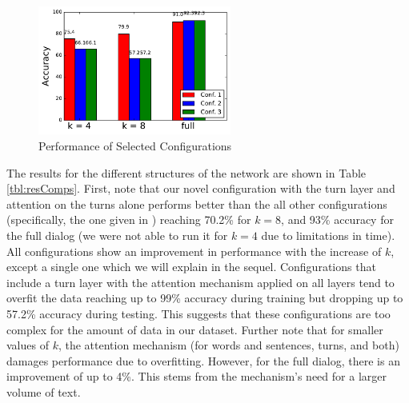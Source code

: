 \begin{figure}[]
    \hspace*{-0.8cm}
    \centering
        \centering
        \includegraphics[trim=0cm 0.5cm 0cm 0cm, width=2.5in]{exp/configs.pdf}
        \caption{Performance of Selected Configurations}
        \label{graph:quality}
    \vspace{-4mm}
\end{figure}


The results for the different structures of the network are shown in Table \ref{tbl:resComps}. 
First, note that our novel configuration with the turn layer and attention on the turns alone 
performs better than the all other configurations (specifically, the one given in \cite{attention}) 
reaching 70.2\% for $k=8$, and 93\% accuracy for the full dialog 
(we were not able to run it for $k=4$ due to limitations in time). 
All configurations show an improvement in performance with the increase of $k$, 
except a single one which we will explain in the sequel. 
Configurations that include a turn layer with the attention mechanism applied on all layers 
tend to overfit the data reaching up to 99\% accuracy during training but 
dropping up to 57.2\% accuracy during testing. 
This suggests that these configurations are too complex for the amount of data in our dataset. 
Further note that for smaller values of $k$, the attention mechanism 
(for words and sentences, turns, and both) damages performance due to overfitting. 
However, for the full dialog, there is an improvement of up to 4\%. 
This stems from the mechanism's need for a larger volume of text.

